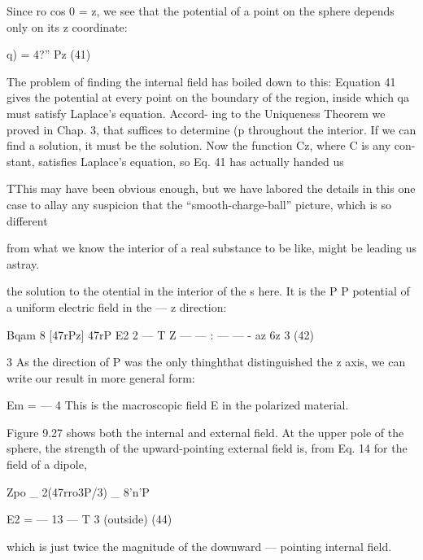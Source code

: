Since ro cos 0 = z, we see that the potential of a point on the sphere
depends only on its z coordinate:

\begin{equation}
\end{equation}
q) = 4?'' Pz (41)

The problem of finding the internal field has boiled down to this:
Equation 41 gives the potential at every point on the boundary of
the region, inside which qa must satisfy Laplace's equation. Accord-
ing to the Uniqueness Theorem we proved in Chap. 3, that suffices
to determine (p throughout the interior. If we can find a solution,
it must be the solution. Now the function Cz, where C is any con-
stant, satisfies Laplace's equation, so Eq. 41 has actually handed us

TThis may have been obvious enough, but we have labored the details in this one
case to allay any suspicion that the ``smooth-charge-ball'' picture, which is so different

from what we know the interior of a real substance to be like, might be leading us
astray.

the solution to the otential in the interior of the s here. It is the
P P
potential of a uniform electric field in the  --- z direction:

\begin{equation}
\end{equation}
Bqam 8 [47rPz] 47rP
E2 2  ---  T Z  ---   ---  :  ---  ---  -
az 6z 3 (42)

3
As the direction of P was the only thinghthat distinguished the z axis,
we can write our result in more general form:

\begin{equation}
\end{equation}
Em =  ---  4%
This is the macroscopic field E in the polarized material.

Figure 9.27 shows both the internal and external field. At the
upper pole of the sphere, the strength of the upward-pointing external
field is, from Eq. 14 for the field of a dipole,

\begin{equation}
\end{equation}
Zpo _ 2(47rro3P/3) _ 8'n'P

E2 =  --- 13 ---  T 3 (outside) (44)

which is just twice the magnitude of the downward --- pointing internal
field.

